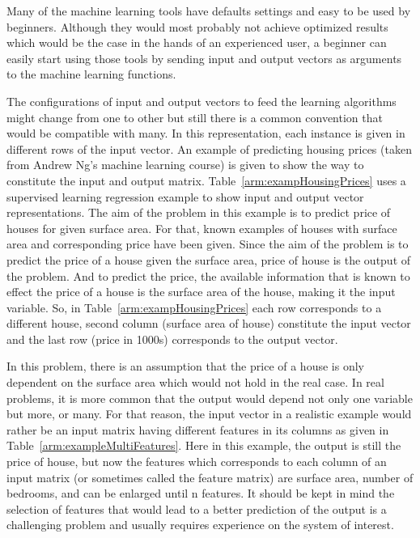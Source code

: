 Many of the machine learning tools have defaults settings and easy to be used by beginners. 
Although they would most probably not achieve optimized results which would be the case in the hands of an experienced user, a beginner can easily start using those tools by sending input and output vectors as arguments to the machine learning functions. 

The configurations of input and output vectors to feed the learning algorithms might change from one to other but still there is a common convention that would be compatible with many. 
In this representation, each instance is given in different rows of the input vector. 
An example of predicting housing prices (taken from Andrew Ng's machine learning course) is given to show the way to constitute the input and output matrix. 
Table~\ref{arm:exampHousingPrices} uses a supervised learning regression example to show input and output vector representations. 
The aim of the problem in this example is to predict price of houses for given surface area. 
For that, known examples of houses with surface area and corresponding price have been given. 
Since the aim of the problem is to predict the price of a house given the surface area, price of house is the output of the problem. 
And to predict the price, the available information that is known to effect the price of a house is the surface area of the house, making it the input variable. 
So, in Table~\ref{arm:exampHousingPrices} each row corresponds to a different house, second column (surface area of house) constitute the input vector and the last row (price in 1000s) corresponds to the output vector. 

In this problem, there is an assumption that the price of a house is only dependent on the surface area which would not hold in the real case. 
In real problems, it is more common that the output would depend not only one variable but more, or many. 
For that reason, the input vector in a realistic example would rather be an input matrix having different features in its columns as given in Table~\ref{arm:exampleMultiFeatures}. 
Here in this example, the output is still the price of house, but now the features which corresponds to each column of an input matrix (or sometimes called the feature matrix) are surface area, number of bedrooms, and can be enlarged until n features. 
It should be kept in mind the selection of features that would lead to a better prediction of the output is a challenging problem and usually requires experience on the system of interest. 

